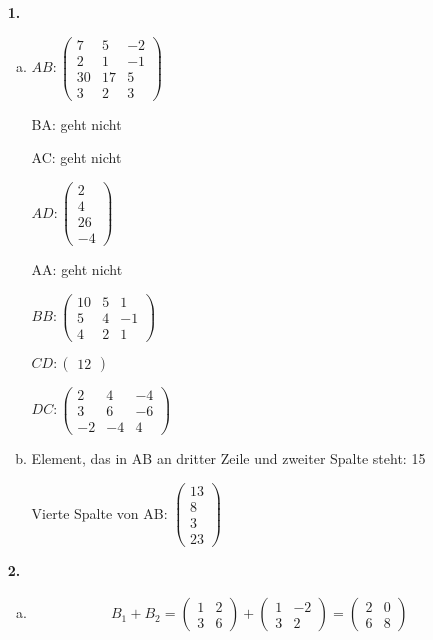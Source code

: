 \documentclass[a4paper]{scrartcl}
\title{\titleinfo}
\author{Elena Noll, Sven-Hendrik Haase, Arne Feil}
\date{\today}
\begin{document}
\maketitle

\begin{enumerate}
\item[\textbf{1.}]
\begin{enumerate}[a)]
\item
$AB:\begin{pmatrix}
7 & 5 & -2 \\
2 & 1 & -1 \\
30 & 17 & 5 \\
3 & 2 & 3
\end{pmatrix}$

BA: geht nicht

AC: geht nicht

$AD:\begin{pmatrix}
2 \\
4 \\
26 \\
-4
\end{pmatrix}$

AA: geht nicht

$BB:\begin{pmatrix}
10 & 5 & 1 \\
5 & 4 & -1 \\
4 & 2 & 1
\end{pmatrix}$

$CD:\begin{pmatrix}
12
\end{pmatrix}$

$DC:\begin{pmatrix}
2 & 4 & -4 \\
3 & 6 & -6 \\
-2 & -4 & 4
\end{pmatrix}$

\item
Element, das in AB an dritter Zeile und zweiter Spalte steht: 15

Vierte Spalte von AB: $\begin{pmatrix}
13 \\
8 \\
3 \\
23
\end{pmatrix}$
\end{enumerate}

\item[\textbf{2.}]
\begin{enumerate}[a)]
\item
\begin{align*}
B_1 + B_2 =
\begin{pmatrix}
1 & 2 \\
3 & 6
\end{pmatrix}
+
\begin{pmatrix}
1 & -2 \\
3 & 2
\end{pmatrix}
=
\begin{pmatrix}
2 & 0 \\
6 & 8
\end{pmatrix}
\end{align*}


\end{enumerate}
\end{enumerate}
\end{document}
